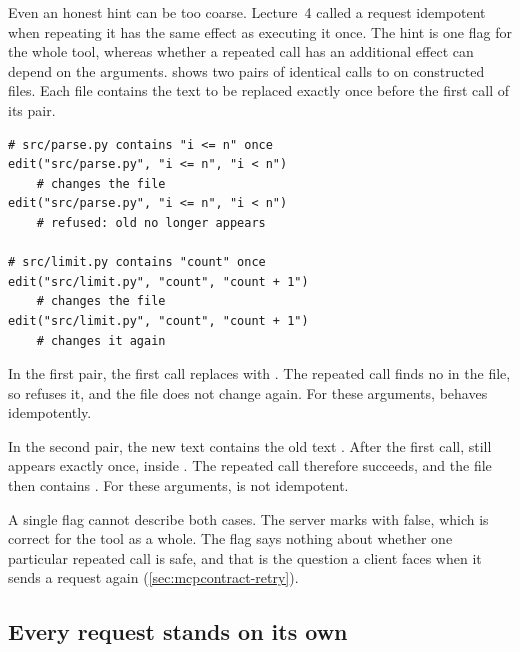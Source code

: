 Even an honest hint can be too coarse. Lecture~4 called a request idempotent when repeating it has
the same effect as executing it once. The hint  is one flag for the whole
tool, whereas whether a repeated call has an additional effect can depend on the arguments.
 shows two pairs of identical calls to  on constructed
files. Each file contains the text to be replaced exactly once before the first call of its pair.

\noindent\begin{minipage}{\linewidth}
\begin{lstlisting}[basicstyle=\ttfamily\footnotesize, caption={Illustrative calls: the same
\texttt{edit} call made twice, for two sets of arguments.}, label=lst:mcpcontract-idem]
# src/parse.py contains "i <= n" once
edit("src/parse.py", "i <= n", "i < n")
    # changes the file
edit("src/parse.py", "i <= n", "i < n")
    # refused: old no longer appears

# src/limit.py contains "count" once
edit("src/limit.py", "count", "count + 1")
    # changes the file
edit("src/limit.py", "count", "count + 1")
    # changes it again
\end{lstlisting}
\end{minipage}

In the first pair, the first call replaces  with . The repeated call
finds no  in the file, so  refuses it, and the file does not change
again. For these arguments,  behaves idempotently.

In the second pair, the new text  contains the old text . After
the first call,  still appears exactly once, inside . The repeated
call therefore succeeds, and the file then contains . For these arguments,
 is not idempotent.

A single flag cannot describe both cases. The server marks  with
 false, which is correct for the tool as a whole. The flag says nothing
about whether one particular repeated call is safe, and that is the question a client faces when it
sends a request again (\cref{sec:mcpcontract-retry}).

\subsection{Every request stands on its own}
\label{sec:mcpcontract-stateless}

